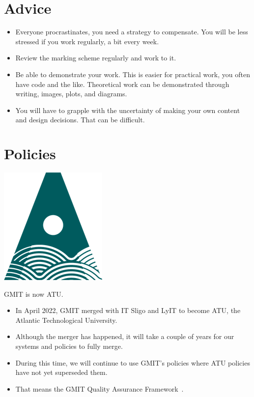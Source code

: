 \documentclass[a4paper]{tufte-handout}
\begin{document}
\section{Advice}

\begin{itemize}
  \item Everyone procrastinates, you need a strategy to compensate. You will be less stressed if you work regularly, a bit every week.
  \item Review the marking scheme regularly and work to it.
  \item Be able to demonstrate your work. This is easier for practical work, you often have code and the like. Theoretical work can be demonstrated through writing, images, plots, and diagrams.
  \item You will have to grapple with the uncertainty of making your own content and design decisions. That can be difficult.
\end{itemize}


\section{Policies}

\begin{marginfigure}%
  \centering
  \includegraphics[width=0.6\linewidth]{img/atu-green.png}
  \caption*{GMIT is now ATU.}
  \label{fig:atulogo}
\end{marginfigure}

\begin{itemize}
  \item In April 2022, GMIT merged with IT Sligo and LyIT to become ATU, the Atlantic Technological University.
  \item Although the merger has happened, it will take a couple of years for our systems and policies to fully merge.
  \item During this time, we will continue to use GMIT's policies where ATU policies have not yet superseded them.
  \item That means the GMIT Quality Assurance Framework~\cite{gmitqaf}.
\end{itemize} 



\end{document}

